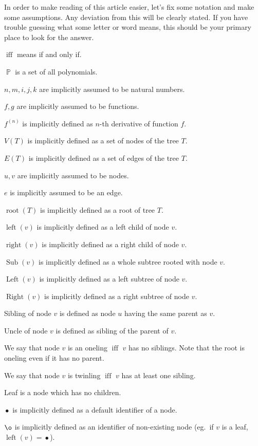 \documentclass[final]{article}
\theoremstyle{definition}
\theoremstyle{remark}
\DeclareMathOperator{\textiff}{\text{iff}}
\DeclareMathOperator{\poly}{\mathbb{P}}
\DeclareMathOperator{\troot}{\text{root}}
\DeclareMathOperator{\tleft}{\text{left}}
\DeclareMathOperator{\tright}{\text{right}}
\DeclareMathOperator{\tLeft}{\text{Left}}
\DeclareMathOperator{\tRight}{\text{Right}}
\DeclareMathOperator{\tSub}{\text{Sub}}
\DeclareMathOperator{\n}{\bullet}
\DeclareMathOperator{\no}{\o}
\begin{document}
In order to make reading of this article easier, let's fix some notation and make some assumptions. Any deviation from this will be clearly stated. If you have trouble guessing what some letter or word means, this should be your primary place to look for the answer.

\(\textiff\) means if and only if.

\(\poly\) is a set of all polynomials.

\(n, m, i, j, k\) are implicitly assumed to be natural numbers.

\(f, g\) are implicitly assumed to be functions.

\(f^{(n)}\) is implicitly defined as \(n\)-th derivative of function \(f\).

\(V(T)\) is implicitly defined as a set of nodes of the tree \(T\).

\(E(T)\) is implicitly defined as a set of edges of the tree \(T\).

\(u, v\) are implicitly assumed to be nodes.

\(e\) is implicitly assumed to be an edge.

\(\troot(T)\) is implicitly defined as a root of tree \(T\).

\(\tleft(v)\) is implicitly defined as a left child of node \(v\).

\(\tright(v)\) is implicitly defined as a right child of node \(v\).

\(\tSub(v)\) is implicitly defined as a whole subtree rooted with node \(v\).

\(\tLeft(v)\) is implicitly defined as a left subtree of node \(v\).

\(\tRight(v)\) is implicitly defined as a right subtree of node \(v\).

Sibling of node \(v\) is defined as node \(u\) having the same parent as \(v\).

Uncle of node \(v\) is defined as sibling of the parent of \(v\).

We say that node \(v\) is an oneling \(\textiff\) \(v\) has no siblings. Note that the root is oneling even if it has no parent.

We say that node \(v\) is twinling \(\textiff\) \(v\) has at least one sibling.

Leaf is a node which has no children.

\(\n\) is implicitly defined as a default identifier of a node.

\(\no\) is implicitly defined as an identifier of non-existing node (eg.\ if \(v\) is a leaf, \(\tleft(v) = \n\)).
\end{document}
